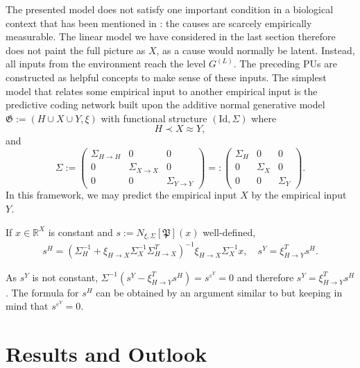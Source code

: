 \documentclass[a4paper,11pt]{report}
\begin{document}
\begin{Par}
The presented model does not satisfy one important condition in a biological context that has been mentioned in : the causes are scarcely empirically measurable. The linear model we have considered in the last section therefore does not paint the full picture as $X$, as a cause would normally be latent. Instead, all inputs from the environment reach the level $G^{(L)}$. The preceding PUs are constructed as helpful concepts to make sense of these inputs. The simplest model that relates some empirical input to another empirical input is the predictive coding network built upon the additive normal generative model $\mathfrak{G}:=\left(H\cup X\cup Y,\xi\right)$ with functional structure $(\text{Id}, \Sigma)$ where
\[
H\prec X\approx Y,
\]
and 
\[
\Sigma:=\begin{pmatrix}
\Sigma_{H\to H}&0&0\\
0&\Sigma_{X\to X}&0\\
0&0&\Sigma_{Y\to Y}
\end{pmatrix}=:
\begin{pmatrix}
\Sigma_H&0&0\\
0&\Sigma_X&0\\
0&0&\Sigma_Y
\end{pmatrix}.
\]
In this framework, we may predict the empirical input $X$ by the empirical input $Y$.
\end{Par}

\begin{Pro}
If $x\in\mathbb{R}^X$ is constant and $s:=N_{\xi,\Sigma}[\mathfrak{P}](x)$ well-defined,
\begin{align*}
s^H=(\Sigma_H^{-1}+\xi_{H\to X}\Sigma_X^{-1}\Sigma_{H\to X}^T)^{-1}\xi_{H\to X}\Sigma_X^{-1}x,
\quad
s^Y=\xi_{H\to Y}^Ts^H.
\end{align*}
\end{Pro}

\begin{Bew}
As $s^Y$ is not constant, $\Sigma^{-1}(s^Y-\xi_{H\to Y}^Ts^H)=s^{\varepsilon^Y}=0$ and therefore $s^Y=\xi_{H\to Y}^Ts^H$. The formula for $s^H$ can be obtained by an argument similar to  but keeping in mind that $s^{\varepsilon^Y}=0$.
\end{Bew}

\section{Results and Outlook}
\end{document}

